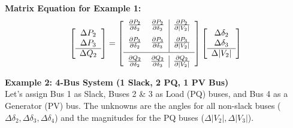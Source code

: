 \documentclass[11pt]{article}
\begin{document}
\textbf{Matrix Equation for Example 1:}
\begin{equation*}
    \left[ \begin{array}{c} 
    \Delta P_2 \\ \Delta P_3 \\ \hline
    \Delta Q_2 
    \end{array} \right] 
    = 
    \left[ \begin{array}{cc | c} 
    \frac{\partial P_2}{\partial \delta_2} & \frac{\partial P_2}{\partial \delta_3} & \frac{\partial P_2}{\partial |V_2|} \\[0.3cm]
    \frac{\partial P_3}{\partial \delta_2} & \frac{\partial P_3}{\partial \delta_3} & \frac{\partial P_3}{\partial |V_2|} \\[0.2cm] \hline \\[-0.3cm]
    \frac{\partial Q_2}{\partial \delta_2} & \frac{\partial Q_2}{\partial \delta_3} & \frac{\partial Q_2}{\partial |V_2|} 
    \end{array} \right]
    \left[ \begin{array}{c} 
    \Delta \delta_2 \\ \Delta \delta_3 \\ \hline
    \Delta |V_2| 
    \end{array} \right]
\end{equation*}

\vspace{0.8cm}

\noindent \textbf{\large Example 2: 4-Bus System (1 Slack, 2 PQ, 1 PV Bus)} \\
Let's assign Bus 1 as Slack, Buses 2 \& 3 as Load (PQ) buses, and Bus 4 as a Generator (PV) bus. 
The unknowns are the angles for all non-slack buses ($\Delta \delta_2, \Delta \delta_3, \Delta \delta_4$) and the magnitudes for the PQ buses ($\Delta |V_2|, \Delta |V_3|$).
\end{document}
